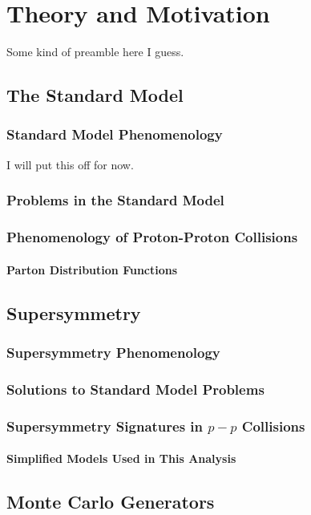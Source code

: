 
\chapter{Theory and Motivation} %

\label{ch:theory} %


Some kind of preamble here I guess.


\section{The Standard Model}


\subsection{Standard Model Phenomenology}

I will put this off for now.

\subsection{Problems in the Standard Model}

\subsection{Phenomenology of Proton-Proton Collisions}
\subsubsection{Parton Distribution Functions}


\section{Supersymmetry}

\subsection{Supersymmetry Phenomenology}
\subsection{Solutions to Standard Model Problems}
\subsection{Supersymmetry Signatures in $p-p$ Collisions}
\subsubsection{Simplified Models Used in This Analysis}
\label{sec:simplified_models}

\section{Monte Carlo Generators}
